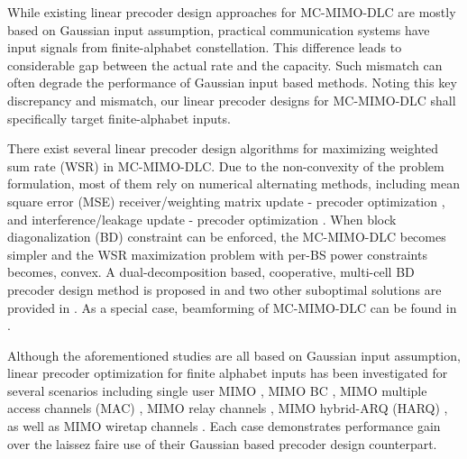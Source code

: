 \documentclass{article}
\begin{document}
While existing linear precoder design approaches for MC-MIMO-DLC are mostly based on Gaussian input assumption,
practical communication systems have input signals from finite-alphabet constellation. This
difference leads to considerable gap between the actual rate and the capacity.  Such mismatch
can often degrade the performance of Gaussian input based methods.
Noting this key discrepancy and mismatch, our linear precoder designs for MC-MIMO-DLC shall specifically target finite-alphabet
inputs.

There exist several linear precoder design algorithms for maximizing weighted sum rate (WSR) in MC-MIMO-DLC.
Due to the non-convexity of the problem formulation, most of them rely on numerical alternating  methods,
including mean square error (MSE) receiver/weighting matrix update - precoder optimization \cite{christensen2008weighted, fritzsche2013robust},
and interference/leakage update - precoder optimization \cite{wang2012coordinated}. When block diagonalization (BD) constraint can be enforced,
the MC-MIMO-DLC becomes simpler and the WSR maximization problem with per-BS power constraints becomes, convex.
A dual-decomposition based, cooperative, multi-cell BD precoder design method is proposed
in \cite{zhang2010cooperative} and  two other suboptimal solutions are provided in \cite{zhang2009networked}.
As a special case, beamforming of MC-MIMO-DLC can be found in \cite{venturino2010coordinated, zhang2010cooperativeinter}.

Although the aforementioned studies are all based on Gaussian input assumption, linear precoder
optimization for finite alphabet inputs has been investigated for several scenarios including single user MIMO \cite{perez2010mimo, xiao2011globally},
MIMO BC \cite{wu2012linear}, MIMO multiple access channels (MAC) \cite{wang2011linear}, MIMO relay channels \cite{liang2012linear, zeng2012linearrelay},
MIMO hybrid-ARQ (HARQ) \cite{liang2011sequential}, as well as MIMO wiretap channels \cite{wu2012linearMIMOME}.
Each case demonstrates performance gain over the laissez faire use of their Gaussian based precoder design counterpart.
\end{document}
